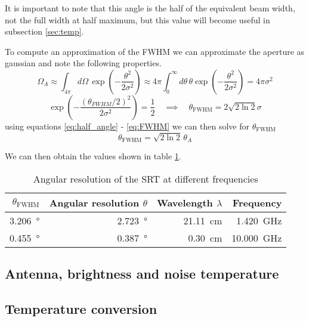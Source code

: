 It is important to note that this angle is the half of the equivalent beam width, not the full width at half maximum, but this value will become useful in subsection \ref{sec:temp}.

To compute an approximation of the FWHM we can approximate the aperture as gaussian \cite[p. 2]{script} and note the following properties.
\begin{equation}
    \Omega_A \approx \int_{4\pi } d\Omega\, \exp{\left( -\frac{\theta^2}{2\sigma^2} \right)} \approx 4\pi \int_0^{\infty} d\theta \, \theta \exp{\left( -\frac{\theta^2}{2\sigma^2} \right)} = 4\pi \sigma^2
    \label{eq:gauss_integral}
\end{equation}
\begin{equation}
    \exp{\left( -\frac{(\theta_{FWHM}/2)^2}{2\sigma^2}\right)} = \frac{1}{2} \quad \implies \quad \theta_{\text{FWHM}} = 2 \sqrt{2\ln{2}} \sigma \label{eq:FWHM}
\end{equation}
using equations \eqref{eq:half_angle} - \eqref{eq:FWHM} we can then solve for $\theta_{\text{FWHM}}$
\begin{equation}
    \theta_{\text{FWHM}} = \sqrt{2\ln{2}} \, \theta_A
\end{equation}

We can then obtain the values shown in table \ref{tab:ang_res}.
\begin{table}[h]
    \centering
    \begin{tabular}{rrrr}
        \toprule
        $\theta_{\text{FWHM}}$ & Angular resolution $\theta$ & Wavelength $\lambda$ & Frequency\\
        \midrule
        \SI{3.206}{\degree} &\SI{2.723}{\degree} & \SI{21.11}{cm} & \SI{1.420}{\giga \hertz}\\
        \SI{0.455}{\degree} &\SI{0.387}{\degree} & \SI{0.30}{cm} & \SI{10.000}{\giga \hertz}\\
        \bottomrule
    \end{tabular}
    \caption{Angular resolution of the SRT at different frequencies}
    \label{tab:ang_res}
\end{table}
\subsection{Antenna, brightness and noise temperature}

\subsection{Temperature conversion}

